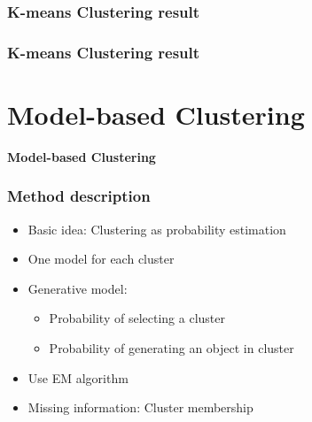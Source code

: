 \documentclass{beamer}
\begin{document}
\begin{frame}
\frametitle{K-means Clustering result}
\begin{center}
  
\end{center}
\end{frame}


\begin{frame}
\frametitle{K-means Clustering result}
\begin{center}
  
\end{center}
\end{frame}




\section{Model-based Clustering}
\begin{frame}
\begin{center}
\textbf{Model-based Clustering}
\end{center} 
\end{frame}
\begin{frame}
\frametitle{Method description}
\begin{center}
 \begin{itemize}
 \item Basic idea: Clustering as probability estimation
\item One model for each cluster
\item Generative model:
\begin{itemize}
\item Probability of selecting a cluster
\item Probability of generating an object in cluster
\end{itemize}
\item Use EM algorithm
\item Missing information: Cluster membership

 \end{itemize}
\end{center}
\end{frame}
\end{document}

